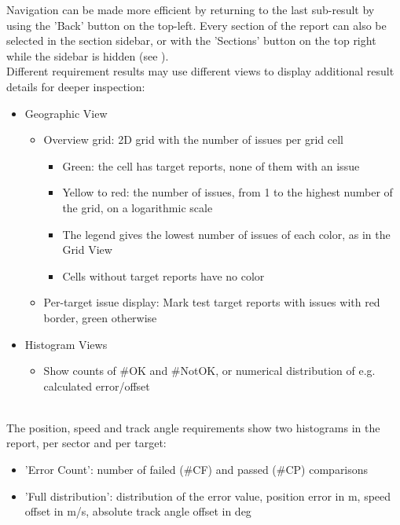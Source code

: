 Navigation can be made more efficient by returning to the last sub-result by using the 'Back' button on the top-left. 
Every section of the report can also be selected in the section sidebar, or with the 'Sections' button on the top right while the sidebar is hidden (see ).\\

Different requirement results may use different views to display additional result details for deeper inspection:

\begin{itemize}  
\item Geographic View
\begin{itemize}  
\item Overview grid: 2D grid with the number of issues per grid cell
\begin{itemize}
\item Green: the cell has target reports, none of them with an issue
\item Yellow to red: the number of issues, from 1 to the highest number of the grid, on a logarithmic scale
\item The legend gives the lowest number of issues of each color, as in the Grid View
\item Cells without target reports have no color
\end{itemize}
\item Per-target issue display: Mark test target reports with issues with red border, green otherwise
\end{itemize}
\item Histogram Views
\begin{itemize}
\item Show counts of \#OK and \#NotOK, or numerical distribution of e.g. calculated error/offset
\end{itemize}
\end{itemize}
\ \\

The position, speed and track angle requirements show two histograms in the report, per sector and per target:

\begin{itemize}
\item 'Error Count': number of failed (\#CF) and passed (\#CP) comparisons
\item 'Full distribution': distribution of the error value, position error in m, speed offset in m/s, absolute track angle offset in deg
\end{itemize}
\ \\

